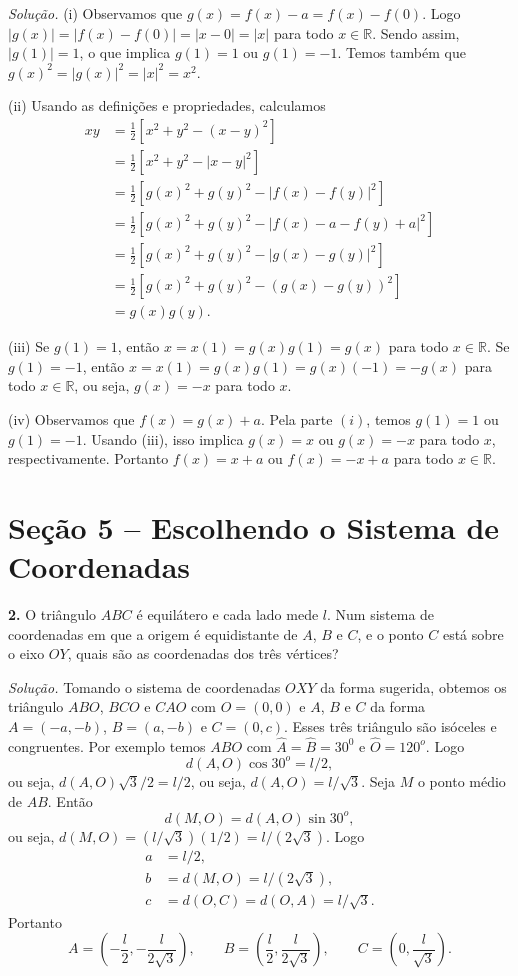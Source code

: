 \documentclass[a4paper,11pt]{article}
\newcommand{\R}{\mathbb{R}}
\begin{document}
\vspace{\baselineskip}

\emph{Solução.}
(i)
Observamos que $g(x) = f(x) - a = f(x) - f(0)$.
Logo $|g(x)| = |f(x)-f(0)| = |x-0| = |x|$ para todo $x \in \R$.
Sendo assim, $|g(1)| = 1$, o que implica $g(1) = 1$ ou $g(1) = -1$.
Temos também que $g(x)^2 = |g(x)|^2 = |x|^2 = x^2$.

(ii)
Usando as definições e propriedades, calculamos
\begin{align*}
  xy & = \frac{1}{2} [x^2 + y^2 - (x-y)^2 ] \\
  & = \frac{1}{2} [ x^2 + y^2 - |x-y|^2 ] \\
  & = \frac{1}{2} [ g(x)^2 + g(y)^2 - |f(x) - f(y)|^2 ] \\
  & = \frac{1}{2} [ g(x)^2 + g(y)^2 - |f(x) - a - f(y) + a|^2 ] \\
  & = \frac{1}{2} [ g(x)^2 + g(y)^2 - |g(x) - g(y)|^2 ] \\
  & = \frac{1}{2} [ g(x)^2 + g(y)^2 - (g(x) - g(y))^2 ] \\
  & = g(x)g(y).
\end{align*}

(iii)
Se $g(1)=1$, então $x = x(1) = g(x)g(1) = g(x)$ para todo $x \in \R$.
Se $g(1)=-1$, então $x = x(1) = g(x)g(1) = g(x)(-1) = -g(x)$ para todo $x \in \R$, ou seja, $g(x) = -x$ para todo $x$.

(iv)
Observamos que $f(x) = g(x) + a$.
Pela parte $(i)$, temos $g(1) = 1$ ou $g(1) = -1$.
Usando (iii), isso implica $g(x)=x$ ou $g(x) = -x$ para todo $x$, respectivamente.
Portanto $f(x) = x + a$ ou $f(x) = -x + a$ para todo $x \in \R$.

\section*{Seção 5 -- Escolhendo o Sistema de Coordenadas}

\textbf{2.}
O triângulo $ABC$ é equilátero e cada lado mede $l$.
Num sistema de coordenadas em que a origem é equidistante de $A$, $B$ e $C$, e o ponto $C$ está sobre o eixo $OY$, quais são as coordenadas dos três vértices?

\vspace{\baselineskip}

\emph{Solução.}
Tomando o sistema de coordenadas $OXY$ da forma sugerida, obtemos os triângulo $ABO$, $BCO$ e $CAO$ com $O = (0,0)$ e $A$, $B$ e $C$ da forma $A = (-a,-b)$, $B = (a,-b)$ e $C = (0,c)$.
Esses três triângulo são isóceles e congruentes.
Por exemplo temos $ABO$ com $\hat{A} = \hat{B} = 30^0$ e $\hat{O} = 120^o$.
Logo
\[
  d(A,O) \cos 30^o = l/2,
\]
ou seja, $d(A,O) \sqrt{3}/2 = l/2$, ou seja, $d(A,O) = l/\sqrt{3}$.
Seja $M$ o ponto médio de $AB$.
Então
\[
  d(M,O) = d(A,O) \sin 30^o,
\]
ou seja, $d(M,O) = (l/\sqrt{3})(1/2) = l/(2\sqrt{3})$.
Logo
\begin{align*}
  a & = l/2, \\
  b & = d(M,O) = l/(2\sqrt{3}), \\
  c & = d(O,C) = d(O,A) = l/\sqrt{3}.
\end{align*}
Portanto
\[
  A = \left(-\frac{l}{2}, -\frac{l}{2\sqrt{3}} \right), \qquad B = \left( \frac{l}{2}, \frac{l}{2\sqrt{3}} \right), \qquad C = \left(0, \frac{l}{\sqrt{3}} \right).
\]
\end{document}
